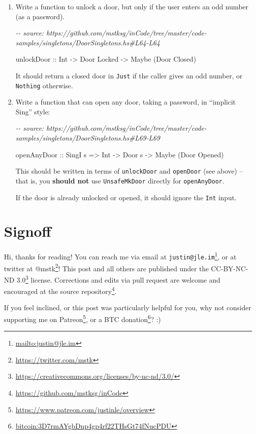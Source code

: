 \documentclass[]{article}
\newenvironment{Shaded}{}{}
\newcommand{\CommentTok}[1]{\textcolor[rgb]{0.38,0.63,0.69}{\textit{#1}}}
\newcommand{\DataTypeTok}[1]{\textcolor[rgb]{0.56,0.13,0.00}{#1}}
\newcommand{\NormalTok}[1]{#1}
\newcommand{\OtherTok}[1]{\textcolor[rgb]{0.00,0.44,0.13}{#1}}
\renewcommand{\href}[2]{#2\footnote{\url{#1}}}
\begin{document}
\begin{enumerate}
\def\labelenumi{\arabic{enumi}.}
\item
  Write a function to unlock a door, but only if the user enters an odd number
  (as a password).

\begin{Shaded}
\begin{Highlighting}[]
\CommentTok{{-}{-} source: https://github.com/mstksg/inCode/tree/master/code{-}samples/singletons/DoorSingletons.hs\#L64{-}L64}

\OtherTok{unlockDoor ::} \DataTypeTok{Int} \OtherTok{{-}>} \DataTypeTok{Door} \DataTypeTok{\textquotesingle{}Locked} \OtherTok{{-}>} \DataTypeTok{Maybe}\NormalTok{ (}\DataTypeTok{Door} \DataTypeTok{\textquotesingle{}Closed}\NormalTok{)}
\end{Highlighting}
\end{Shaded}

  It should return a closed door in \texttt{Just} if the caller gives an odd
  number, or \texttt{Nothing} otherwise.
\item
  Write a function that can open any door, taking a password, in ``implicit
  Sing'' style:

\begin{Shaded}
\begin{Highlighting}[]
\CommentTok{{-}{-} source: https://github.com/mstksg/inCode/tree/master/code{-}samples/singletons/DoorSingletons.hs\#L69{-}L69}

\OtherTok{openAnyDoor ::} \DataTypeTok{SingI}\NormalTok{ s }\OtherTok{=>} \DataTypeTok{Int} \OtherTok{{-}>} \DataTypeTok{Door}\NormalTok{ s }\OtherTok{{-}>} \DataTypeTok{Maybe}\NormalTok{ (}\DataTypeTok{Door} \DataTypeTok{\textquotesingle{}Opened}\NormalTok{)}
\end{Highlighting}
\end{Shaded}

  This should be written in terms of \texttt{unlockDoor} and \texttt{openDoor}
  (see above) -- that is, you \textbf{should not} use \texttt{UnsafeMkDoor}
  directly for \texttt{openAnyDoor}.

  If the door is already unlocked or opened, it should ignore the \texttt{Int}
  input.
\end{enumerate}

\hypertarget{signoff}{%
\section{Signoff}\label{signoff}}

Hi, thanks for reading! You can reach me via email at
\href{mailto:justin@jle.im}{\nolinkurl{justin@jle.im}}, or at twitter at
\href{https://twitter.com/mstk}{@mstk}! This post and all others are published
under the \href{https://creativecommons.org/licenses/by-nc-nd/3.0/}{CC-BY-NC-ND
3.0} license. Corrections and edits via pull request are welcome and encouraged
at \href{https://github.com/mstksg/inCode}{the source repository}.

If you feel inclined, or this post was particularly helpful for you, why not
consider \href{https://www.patreon.com/justinle/overview}{supporting me on
Patreon}, or a \href{bitcoin:3D7rmAYgbDnp4gp4rf22THsGt74fNucPDU}{BTC donation}?
:)
\end{document}
